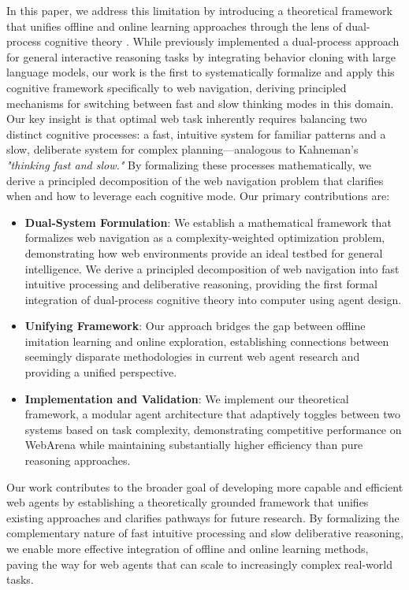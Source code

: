 \documentclass{article}
\begin{document}
In this paper, we address this limitation by introducing a theoretical framework that unifies offline and online learning approaches through the lens of dual-process cognitive theory \citep{kahneman2011thinking}. While \citet{lin2023swiftsage} previously implemented a dual-process approach for general interactive reasoning tasks by integrating behavior cloning with large language models, our work is the first to systematically formalize and apply this cognitive framework specifically to web navigation, deriving principled mechanisms for switching between fast and slow thinking modes in this domain. Our key insight is that optimal web task inherently requires balancing two distinct cognitive processes: a fast, intuitive system for familiar patterns and a slow, deliberate system for complex planning—analogous to Kahneman's \textit{"thinking fast and slow."} By formalizing these processes mathematically, we derive a principled decomposition of the web navigation problem that clarifies when and how to leverage each cognitive mode. Our primary contributions are:
\begin{itemize}
    \item \textbf{Dual-System Formulation}: We establish a mathematical framework that formalizes web navigation as a complexity-weighted optimization problem, demonstrating how web environments provide an ideal testbed for general intelligence. We derive a principled decomposition of web navigation into fast intuitive processing and deliberative reasoning, providing the first formal integration of dual-process cognitive theory into computer using agent design.
    \item \textbf{Unifying Framework}: Our approach bridges the gap between offline imitation learning and online exploration, establishing connections between seemingly disparate methodologies in current web agent research and providing a unified perspective.
    \item \textbf{Implementation and Validation}: We implement our theoretical framework, a modular agent architecture that adaptively toggles between two systems based on task complexity, demonstrating competitive performance on WebArena while maintaining substantially higher efficiency than pure reasoning approaches.
\end{itemize}

Our work contributes to the broader goal of developing more capable and efficient web agents by establishing a theoretically grounded framework that unifies existing approaches and clarifies pathways for future research. By formalizing the complementary nature of fast intuitive processing and slow deliberative reasoning, we enable more effective integration of offline and online learning methods, paving the way for web agents that can scale to increasingly complex real-world tasks.
\end{document}
